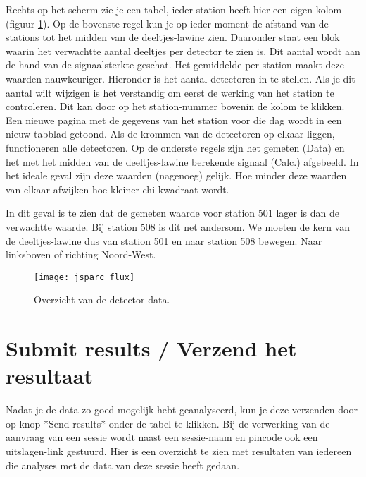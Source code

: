 Rechts op het scherm zie je een tabel, ieder station heeft hier een eigen kolom 
(figuur \ref{fig:detectordata}).
Op de bovenste regel kun je op ieder moment de afstand van de stations tot 
het midden van de deeltjes-lawine zien. Daaronder staat een blok waarin het 
verwachtte aantal deeltjes per detector te zien is. Dit aantal wordt aan de 
hand van de signaalsterkte geschat. Het gemiddelde per station maakt deze 
waarden nauwkeuriger. Hieronder is het aantal detectoren in te stellen. Als je 
dit aantal wilt wijzigen is het verstandig om eerst de werking van het station 
te controleren. Dit kan door op het station-nummer bovenin de kolom te klikken. 
Een nieuwe pagina met de gegevens van het station voor die dag wordt in een 
nieuw tabblad getoond. Als de krommen van de detectoren op elkaar liggen, 
functioneren alle detectoren.
Op de onderste regels zijn het gemeten (Data) en het met het midden van de 
deeltjes-lawine berekende signaal (Calc.) afgebeeld. In het ideale geval zijn 
deze waarden (nagenoeg) gelijk. 
Hoe minder deze waarden van elkaar afwijken hoe kleiner chi-kwadraat wordt.

In dit geval is te zien dat de gemeten waarde voor station 501 lager is dan de verwachtte waarde. Bij station 508 is dit net andersom. We moeten de kern van de deeltjes-lawine dus van station 501 en naar station 508 bewegen. Naar linksboven of richting Noord-West.

\begin{figure}[ht]
    \centering
    \texttt{[image: jsparc\_flux]}
    \caption{Overzicht  van de detector data. }
    \label{fig:detectordata}
\end{figure}

\section{Submit results / Verzend het resultaat}

Nadat je de data zo goed mogelijk hebt geanalyseerd, kun je deze verzenden 
door op knop *Send results* onder de tabel te klikken. Bij de verwerking van 
de aanvraag van een sessie wordt naast een sessie-naam en pincode ook een 
uitslagen-link gestuurd. Hier is een overzicht te zien met resultaten van 
iedereen die analyses met de data van deze sessie heeft gedaan. 
   
